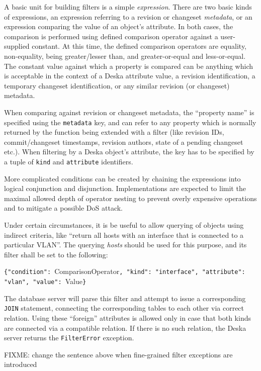 \documentclass{article}
\begin{document}
A basic unit for building filters is a simple {\em expression}.  There are two basic kinds of expressions, an expression
referring to a revision or changeset {\em metadata}, or an expression comparing the value of an object's attribute.  In
both cases, the comparison is performed using defined comparison operator against a user-supplied constant.  At this
time, the defined comparison operators are equality, non-equality, being greater/lesser than, and greater-or-equal and
less-or-equal.  The constant value against which a property is compared can be anything which is acceptable in the
context of a Deska attribute value, a revision identification, a temporary changeset identification, or any similar
revision (or changeset) metadata.

When comparing against revision or changeset metadata, the ``property name'' is specified using the {\tt metadata} key,
and can refer to any property which is normally returned by the function being extended with a filter (like revision
IDs, commit/changeset timestamps, revision authors, state of a pending changeset etc.).  When filtering by a Deska
object's attribute, the key has to be specified by a tuple of {\tt kind} and {\tt attribute} identifiers.

More complicated conditions can be created by chaining the expressions into logical conjunction and disjunction.
Implementations are expected to limit the maximal allowed depth of operator nesting to prevent overly expensive
operations and to mitigate a possible DoS attack.

Under certain circumstances, it is be useful to allow querying of objects using indirect criteria, like ``return all
hosts with an interface that is connected to a particular VLAN''.  The  querying {\em
hosts} should be used for this purpose, and its filter shall be set to the following:

{\tt \{"condition": }ComparisonOperator{\tt, "kind": "interface", "attribute": "vlan", "value": }Value{\tt \}}

The database server will parse this filter and attempt to issue a corresponding {\tt JOIN} statement, connecting the
corresponding tables to each other via correct relation.  Using these
``foreign'' attributes is allowed only in case that both kinds are connected via a compatible relation.  If there is no
such relation, the Deska server returns the {\tt FilterError} exception.

FIXME: change the sentence above when fine-grained filter exceptions are introduced
\end{document}
